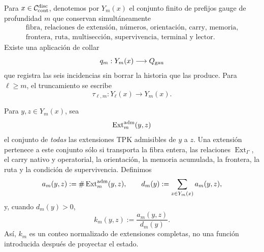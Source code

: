 Para \(x\in\mathcal C_{\rm cont}^{\rm disc}\), denotemos por
\(Y_m(x)\) el conjunto finito de prefijos gauge de profundidad \(m\) que
conservan simultáneamente
\begin{equation*}
\begin{gathered}
 \text{fibra, relaciones de extensión, números, orientación, carry, memoria,}\\
 \text{frontera, ruta, multisección, supervivencia, terminal y lector}.
\end{gathered}
\end{equation*}
Existe una aplicación de collar
\begin{equation}\label{eq:gauint-collar}
 q_m:Y_m(x)\longrightarrow Q_{\rm gau}
\end{equation}
que registra las seis incidencias sin borrar la historia que las produce.
Para \(\ell\ge m\), el truncamiento se escribe
\[
 \tau_{\ell,m}:Y_\ell(x)\longrightarrow Y_m(x).
\]

Para \(y,z\in Y_m(x)\), sea
\begin{equation}\label{eq:gauint-todas-extensiones}
 \operatorname{Ext}^{\rm adm}_{m}(y,z)
\end{equation}
el conjunto de \emph{todas} las extensiones TPK admisibles de \(y\) a \(z\).
Una extensión pertenece a este conjunto sólo si transporta la fibra entera,
las relaciones \(\operatorname{Ext}_\Gamma\), el carry nativo y operatorial,
la orientación, la memoria acumulada, la frontera, la ruta y la condición de
supervivencia. Definimos
\begin{equation}\label{eq:gauint-conteo-kernel}
 a_m(y,z):=\#\operatorname{Ext}^{\rm adm}_m(y,z),
 \qquad
 d_m(y):=\sum_{z\in Y_m(x)}a_m(y,z),
\end{equation}
y, cuando \(d_m(y)>0\),
\begin{equation}\label{eq:gauint-kernel-normalizado}
 k_m(y,z):=\frac{a_m(y,z)}{d_m(y)}.
\end{equation}
Así, \(k_m\) es un conteo normalizado de extensiones completas, no una
función introducida después de proyectar el estado.

